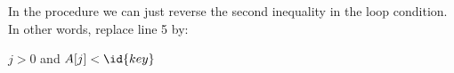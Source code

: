 In the  procedure we can just reverse the second inequality in the  loop condition.
In other words, replace line 5 by:

\begin{codebox}
\setcounter{codelinenumber}{4}
\zi    \While $j>0$ and $A[j]<\id{key}$
\end{codebox}

